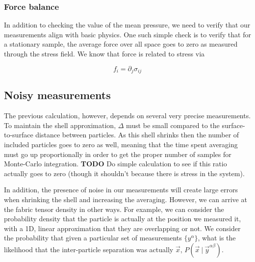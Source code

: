 \documentclass[twocolumn,amsmath,amssymb]{revtex4}
\newcommand\given[1][]{\:#1\vert\:}
\begin{document}
\subsubsection{Force balance}

In addition to checking the value of the mean pressure, we need to verify
that our measurements align with basic physics. One such simple check is
to verify that for a stationary sample, the average force over all
space goes to zero as measured through the stress field.  We know that
force is related to stress via

\begin{equation}
    f_i = \partial_j \sigma_{ij}
\end{equation}

\subsection{Noisy measurements}

The previous calculation, however, depends on several very precise
measurements.  To maintain the shell approximation, $\Delta$ must be small
compared to the surface-to-surface distance between particles.  As this shell
shrinks then the number of included particles goes to zero as well, meaning
that the time spent averaging must go up proportionally in order to get the
proper number of samples for Monte-Carlo integration. {\bf TODO} Do simple
calculation to see if this ratio actually goes to zero (though it shouldn't
because there is stress in the system).

In addition, the presence of noise in our measurements will create large errors
when shrinking the shell and increasing the averaging.  However, we can arrive
at the fabric tensor density in other ways.  For example, we can consider the
probability density that the particle is actually at the position we measured
it, with a 1D, linear approximation that they are overlapping or not.  We
consider the probability that given a particular set of measurements
$\{y^{\alpha}\}$, what is the likelihood that the inter-particle separation was
actually $\vec{x}$, $P(\vec{x} \given \vec{y}^{\alpha\beta})$.

\end{document}
